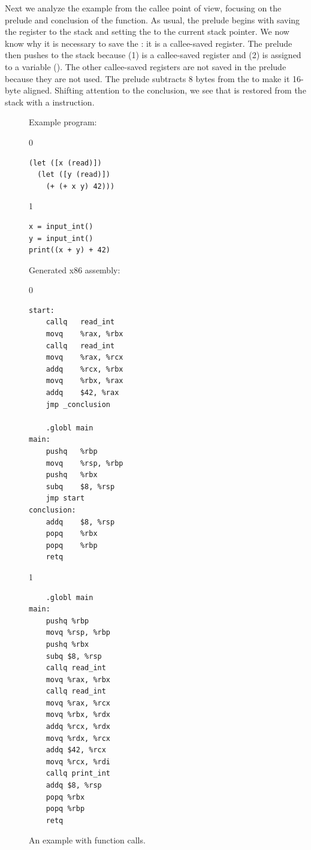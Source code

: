 \documentclass[7x10]{TimesAPriori_MIT}%
\def\racketEd{0}
\def\pythonEd{1}
\def\edition{0}
\numberwithin{theorem}{chapter}
\numberwithin{definition}{chapter}
\numberwithin{equation}{chapter}
\begin{document}
Next we analyze the example from the callee point of view, focusing on
the prelude and conclusion of the  function. As usual, the
prelude begins with saving the  register to the stack and
setting the  to the current stack pointer. We now know why
it is necessary to save the : it is a callee-saved register.
The prelude then pushes  to the stack because (1) 
is a callee-saved register and (2)  is assigned to a variable
(). The other callee-saved registers are not saved in the
prelude because they are not used. The prelude subtracts 8 bytes from
the  to make it 16-byte aligned. Shifting attention to the
conclusion, we see that  is restored from the stack with a
 instruction.

\begin{figure}[tp]
\begin{tcolorbox}[colback=white]
  
\begin{minipage}{0.45\textwidth}
Example \LangVar{} program:
{\if\edition\racketEd
\begin{lstlisting}
(let ([x (read)])
  (let ([y (read)])
    (+ (+ x y) 42)))
\end{lstlisting}
\fi}
{\if\edition\pythonEd
\begin{lstlisting}
x = input_int()
y = input_int()
print((x + y) + 42)
\end{lstlisting}
\fi}
\end{minipage}
\begin{minipage}{0.45\textwidth}
Generated x86 assembly:
{\if\edition\racketEd
\begin{lstlisting}
start:
	callq	read_int
	movq	%rax, %rbx
	callq	read_int
	movq	%rax, %rcx
	addq	%rcx, %rbx
	movq	%rbx, %rax
	addq	$42, %rax
	jmp _conclusion

	.globl main
main:
	pushq	%rbp
	movq	%rsp, %rbp
	pushq	%rbx
	subq	$8, %rsp
	jmp start
conclusion:
	addq	$8, %rsp
	popq	%rbx
	popq	%rbp
	retq
\end{lstlisting}
\fi}
{\if\edition\pythonEd
\begin{lstlisting}
	.globl main
main:
	pushq %rbp
	movq %rsp, %rbp
	pushq %rbx
	subq $8, %rsp
	callq read_int
	movq %rax, %rbx
	callq read_int
	movq %rax, %rcx
	movq %rbx, %rdx
	addq %rcx, %rdx
	movq %rdx, %rcx
	addq $42, %rcx
	movq %rcx, %rdi
	callq print_int
	addq $8, %rsp
	popq %rbx
	popq %rbp
	retq
\end{lstlisting}
\fi}
\end{minipage}
\end{tcolorbox}

\caption{An example with function calls.}
  \label{fig:example-calling-conventions}
\end{figure}
\end{document}
